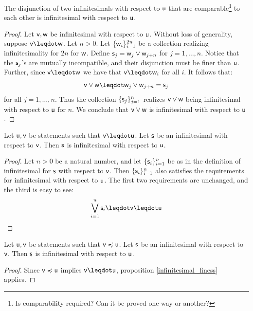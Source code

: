 \documentclass[10pt, onecolumn, longbibliography, nofootinbib]{revtex4-2}
\begin{document}
\begin{prop}\label{infinitesimal_disjunction}
	The disjunction of two infinitesimals with respect to $\stmt[u]$ that are comparable\footnote{Is comparability required? Can it be proved one way or another?} to each other is infinitesimal with respect to $\stmt[u]$.
\end{prop}
\begin{proof}
	Let $\stmt[v],\stmt[w]$ be infinitesimal with respect to $\stmt[u]$. Without loss of generality, suppose $\stmt[v] \finer \stmt[w]$. Let $n>0$. Let $\{\stmt[w]_i\}_{i=1}^{2n}$ be a collection realizing infinitesimality for $2n$ for $\stmt[w]$. Define $\stmt_j = \stmt[w]_j\OR\stmt[w]_{j+n}$ for $j=1,\ldots,n$. Notice that the $\stmt_j$'s are mutually incompatible, and their disjunction must be finer than $\stmt[u]$. Further, since $\stmt[v]\finer\stmt[w]$ we have that $\stmt[v]\finer\stmt[w]_i$ for all $i$. It follows that:
	$$
	\stmt[v]\OR\stmt[w] \finer \stmt[w]_j\OR\stmt[w]_{j+n} = \stmt_j
	$$
	for all $j=1,\ldots,n$. Thus the collection $\{\stmt_j\}_{j=1}^n$ realizes $\stmt[v]\OR\stmt[w]$ being infinitesimal with respect to $\stmt[u]$ for $n$. We conclude that $\stmt[v]\OR\stmt[w]$ is infinitesimal with respect to $\stmt[u]$. 
\end{proof}

\begin{prop}\label{infinitesimal_finess}
	Let $\stmt[u],\stmt[v]$ be statements such that $\stmt[v]\finer\stmt[u]$. Let $\stmt$ be an infinitesimal with respect to $\stmt[v]$. Then $\stmt$ is infinitesimal with respect to $\stmt[u]$. 
\end{prop}
\begin{proof}
	Let $n>0$ be a natural number, and let $\{ \stmt_i \}_{i=1}^n$ be as in the definition of infinitesimal for $\stmt$ with respect to $\stmt[v]$. Then $\{ \stmt_i \}_{i=1}^n$ also satisfies the requirements for infinitesimal with respect to $\stmt[u]$. The first two requirements are unchanged, and the third is easy to see:
	$$
	\bigOR\limits_{i=1}^n \stmt_i \finer\stmt[v]\finer \stmt[u]
	$$
\end{proof}

\begin{coro}
	Let $\stmt[u],\stmt[v]$ be statements such that $\stmt[v]\narrower\stmt[u]$. Let $\stmt$ be an infinitesimal with respect to $\stmt[v]$. Then $\stmt$ is infinitesimal with respect to $\stmt[u]$.
\end{coro}
\begin{proof}
	Since $\stmt[v]\narrower\stmt[u]$ implies $\stmt[v]\finer\stmt[u]$, proposition \ref{infinitesimal_finess} applies.
\end{proof}
\end{document}
